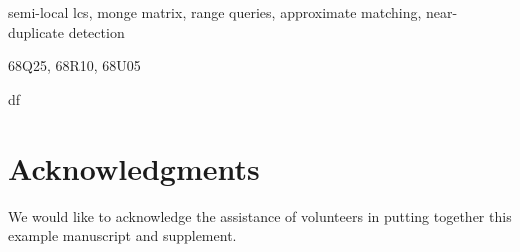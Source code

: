 \documentclass[review,onefignum,onetabnum]{siamart190516}
\begin{document}
\maketitle



\begin{keywords}
  semi-local lcs, monge matrix, range queries, approximate matching, near-duplicate detection
\end{keywords}

\begin{AMS}
  68Q25, 68R10, 68U05
\end{AMS}









df\cite{GoVa13}

\section*{Acknowledgments}
We would like to acknowledge the assistance of volunteers in putting
together this example manuscript and supplement.



\end{document}
